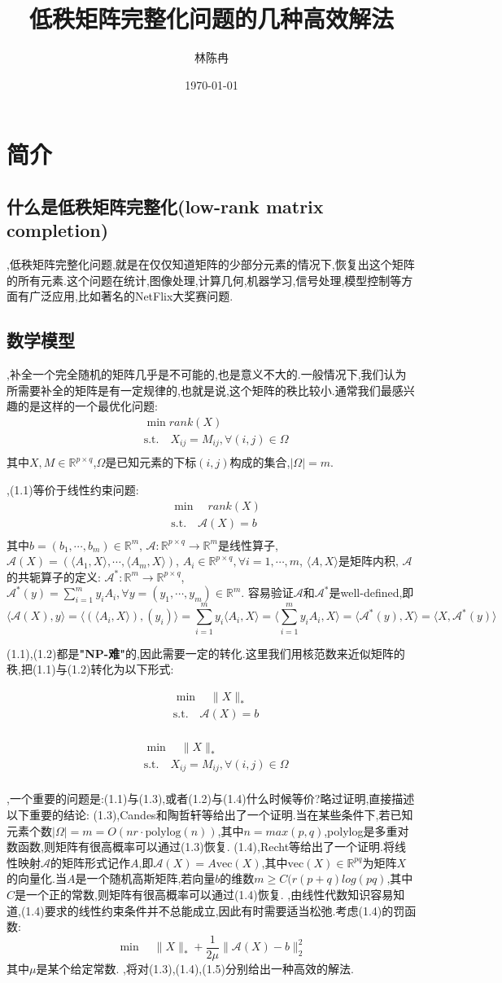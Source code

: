 \documentclass[UTF8]{ctexart}
\title{低秩矩阵完整化问题的几种高效解法}
\author{林陈冉}
\date{\today}
\newcommand{\s}{\quad}
\renewcommand{\b}{\textbf}
\newcommand{\p}{\paragraph{}\s}
\newcommand{\sect}{\section}
\newcommand{\ssect}{\subsection}
\newcommand{\equSplit}[1]{\begin{equation}\begin{split}#1\end{split}\end{equation}}
\newcommand{\equ}[1]{\begin{equation}#1\end{equation}}
\newcommand{\Tst}{\text{s.t.}\s}
\newcommand{\abs}[1]{\lvert#1\rvert}
\newcommand{\norm}[1]{\lVert#1\rVert}
\newcommand{\inprod}[1]{\langle#1\rangle}
\newcommand{\Real}[1]{\mathbb{R}^{#1}}
\newcommand{\nunorm}{\norm{X}_*}
\newcommand{\Ma}{\mathcal{A}}
\numberwithin{equation}{section}
\begin{document}
\maketitle
	\sect{简介}
		\ssect{什么是低秩矩阵完整化(low-rank matrix completion)}

		,低秩矩阵完整化问题,就是在仅仅知道矩阵的少部分元素的情况下,恢复出这个矩阵的所有元素.这个问题在统计,图像处理,计算几何,机器学习,信号处理,模型控制等方面有广泛应用,比如著名的NetFlix大奖赛问题.

		\ssect{数学模型}

		,补全一个完全随机的矩阵几乎是不可能的,也是意义不大的.一般情况下,我们认为所需要补全的矩阵是有一定规律的,也就是说,这个矩阵的秩比较小.通常我们最感兴趣的是这样的一个最优化问题:
		\equSplit{
			&\min rank(X)\\
			&\Tst X_{ij}=M_{ij},\forall(i,j)\in\Omega\\
		}
		其中$X,M\in\Real{p\times q}$,$\Omega$是已知元素的下标$(i,j)$构成的集合,$\abs{\Omega}=m$.

		,(1.1)等价于线性约束问题:
		\equSplit{
			&\min\s rank(X)\\
			&\Tst \mathcal{A}(X)=b\\
		}
		其中$b=(b_1,\cdots,b_m)\in\Real{m}$,
		$\mathcal{A}:\Real{p\times q}\rightarrow\Real{m}$是线性算子,
		$\Ma(X)=(\inprod{A_1,X},\cdots,\inprod{A_m,X})$,
		$A_i\in\Real{p\times q},\forall i=1,\cdots,m$,
		$\inprod{A,X}$是矩阵内积,
		$\Ma$的共轭算子的定义:
		$\Ma^*:\Real{m}\rightarrow\Real{p\times q}$,
		$\Ma^*(y)=\sum^m_{i=1}y_iA_i,\forall y=(y_1,\cdots,y_m)\in\Real{m}$.
		容易验证$\Ma$和$\Ma^*$是well-defined,即
		\[
			\inprod{\Ma(X),y}=\inprod{(\inprod{A_i,X}),(y_i)}=
			\sum^m_{i=1}y_i\inprod{A_i,X}=\inprod{\sum^m_{i=1}y_iA_i,X}
			=\inprod{\Ma^*(y),X}=\inprod{X,\Ma^*(y)}
		\]

		(1.1),(1.2)都是\b{"NP-难"}的,因此需要一定的转化.这里我们用核范数来近似矩阵的秩,把(1.1)与(1.2)转化为以下形式:

		\equSplit{
			&\min\s\nunorm\\
			&\Tst \mathcal{A}(X)=b\\	
		}

		\equSplit{
			&\min\s\nunorm\\
			&\Tst X_{ij}=M_{ij},\forall(i,j)\in\Omega\\
		}

		,一个重要的问题是:(1.1)与(1.3),或者(1.2)与(1.4)什么时候等价?略过证明,直接描述以下重要的结论:
		(1.3),Candes和陶哲轩等给出了一个证明.当在某些条件下,若已知元素个数$\abs{\Omega}=m=O(nr\cdot\text{polylog}(n))$,其中$n=max(p,q)$,polylog是多重对数函数,则矩阵有很高概率可以通过(1.3)恢复.
		(1.4),Recht等给出了一个证明.将线性映射$\mathcal{A}$的矩阵形式记作$A$,即$\mathcal{A}(X)=A\text{vec}(X)$,其中$\text{vec}(X)\in\Real{pq}$为矩阵$X$的向量化.当$A$是一个随机高斯矩阵,若向量$b$的维数$m\geq C(r(p+q)log(pq)$,其中$C$是一个正的常数,则矩阵有很高概率可以通过(1.4)恢复.
		,由线性代数知识容易知道,(1.4)要求的线性约束条件并不总能成立,因此有时需要适当松弛.考虑(1.4)的罚函数:
		\equ{\min\s\nunorm+\frac{1}{2\mu}\norm{\mathcal{A}(X)-b}_2^2}
		其中$\mu$是某个给定常数.
		,将对(1.3),(1.4),(1.5)分别给出一种高效的解法.
\end{document}
